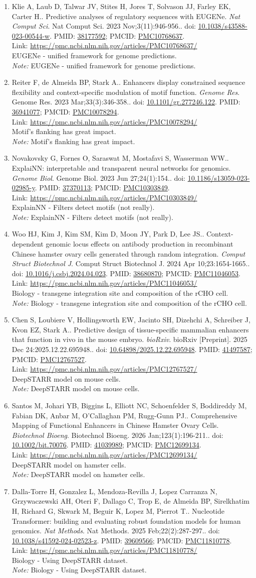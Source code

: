 \documentclass[12pt]{article}
\newcommand{\Pub}[9]{%
  \item #1. #2. \textit{#3}. #4. doi: \href{https://doi.org/#5}{#5}. PMID: \href{https://pubmed.ncbi.nlm.nih.gov/#6/}{#6}; PMCID: \href{https://www.ncbi.nlm.nih.gov/pmc/articles/#7/}{#7}. \\
  \noindent Link: \url{#8}\\
  \ifx#9\relax\else\\\textit{Note:} #9\fi
}
\begin{document}
\begin{enumerate}[leftmargin=*,label=\textbf{\arabic*.}]
\Pub{Klie A, Laub D, Talwar JV, Stites H, Jores T, Solvason JJ, Farley EK, Carter H.}{Predictive analyses of regulatory sequences with EUGENe}{Nat Comput Sci}{Nat Comput Sci. 2023 Nov;3(11):946-956.}{10.1038/s43588-023-00544-w}{38177592}{PMC10768637}{https://pmc.ncbi.nlm.nih.gov/articles/PMC10768637/}{EUGENe - unified framework for genome predictions.}

\Pub{Reiter F, de Almeida BP, Stark A.}{Enhancers display constrained sequence flexibility and context-specific modulation of motif function}{Genome Res}{Genome Res. 2023 Mar;33(3):346-358.}{10.1101/gr.277246.122}{36941077}{PMC10078294}{https://pmc.ncbi.nlm.nih.gov/articles/PMC10078294/}{Motif's flanking has great impact.}

\Pub{Novakovsky G, Fornes O, Saraswat M, Mostafavi S, Wasserman WW.}{ExplaiNN: interpretable and transparent neural networks for genomics}{Genome Biol}{Genome Biol. 2023 Jun 27;24(1):154.}{10.1186/s13059-023-02985-y}{37370113}{PMC10303849}{https://pmc.ncbi.nlm.nih.gov/articles/PMC10303849/}{ExplainNN - Filters detect motifs (not really).}

\Pub{Woo HJ, Kim J, Kim SM, Kim D, Moon JY, Park D, Lee JS.}{Context-dependent genomic locus effects on antibody production in recombinant Chinese hamster ovary cells generated through random integration}{Comput Struct Biotechnol J}{Comput Struct Biotechnol J. 2024 Apr 10;23:1654-1665.}{10.1016/j.csbj.2024.04.023}{38680870}{PMC11046053}{https://pmc.ncbi.nlm.nih.gov/articles/PMC11046053/}{Biology - transgene integration site and composition of the rCHO cell.}

\Pub{Chen S, Loubiere V, Hollingsworth EW, Jacinto SH, Dizehchi A, Schreiber J, Kvon EZ, Stark A.}{Predictive design of tissue-specific mammalian enhancers that function in vivo in the mouse embryo}{bioRxiv}{bioRxiv [Preprint]. 2025 Dec 24:2025.12.22.695948.}{10.64898/2025.12.22.695948}{41497587}{PMC12767527}{https://pmc.ncbi.nlm.nih.gov/articles/PMC12767527/}{DeepSTARR model on mouse cells.}

\Pub{Santos M, Johari YB, Biggins L, Elliott NC, Schoenfelder S, Boddireddy M, Fabian DK, Anbar M, O'Callaghan PM, Rugg-Gunn PJ.}{Comprehensive Mapping of Functional Enhancers in Chinese Hamster Ovary Cells}{Biotechnol Bioeng}{Biotechnol Bioeng. 2026 Jan;123(1):196-211.}{10.1002/bit.70076}{41039989}{PMC12699134}{https://pmc.ncbi.nlm.nih.gov/articles/PMC12699134/}{DeepSTARR model on hamster cells.}

\Pub{Dalla-Torre H, Gonzalez L, Mendoza-Revilla J, Lopez Carranza N, Grzywaczewski AH, Oteri F, Dallago C, Trop E, de Almeida BP, Sirelkhatim H, Richard G, Skwark M, Beguir K, Lopez M, Pierrot T.}{Nucleotide Transformer: building and evaluating robust foundation models for human genomics}{Nat Methods}{Nat Methods. 2025 Feb;22(2):287-297.}{10.1038/s41592-024-02523-z}{39609566}{PMC11810778}{https://pmc.ncbi.nlm.nih.gov/articles/PMC11810778/}{Biology - Using DeepSTARR dataset.}


\end{enumerate}
\end{document}
